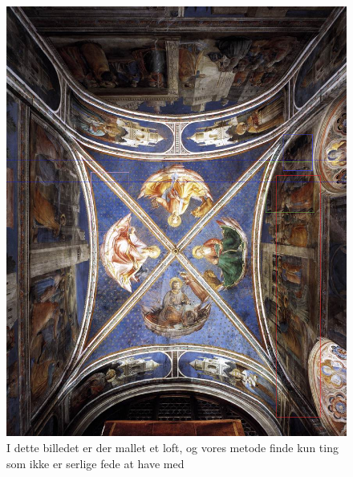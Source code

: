 \begin{figure}[h!!]
	\begin{center}
		\includegraphics[scale=0.30,angle=0]{afsnit/afprovning/billeder/BB3vault.png}
	\end{center}
	\caption[]{I dette billedet er der mallet et loft, og vores metode
	          finde kun ting som ikke er serlige fede at have med}
	\label{BB3vault}
\end{figure}

